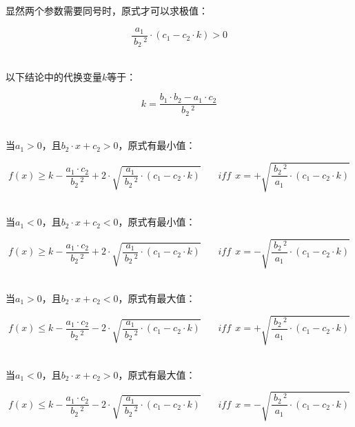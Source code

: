 \documentclass[UTF8]{ctexart}
\begin{document}
\newpage

    显然两个参数需要同号时，原式才可以求极值：
    \begin{large}
        \begin{equation*}
            \frac{a_1}{~b_2\,^2}\cdot(c_1-c_2\cdot k)>0
        \end{equation*}
    \end{large}\\
    以下结论中的代换变量$k$等于：
    \begin{large}
        \begin{equation*}
            k=\frac{b_1\cdot b_2-a_1\cdot c_2}{b_2\,^2}
        \end{equation*}
    \end{large}\\
    当$a_1>0$，且$b_2\cdot x+c_2>0$，原式有最小值：\vspace{3pt}
    \begin{large}
        \begin{equation*}
            f(x)\ge k-\frac{a_1\cdot c_2}{b_2\,^2}+2\cdot\sqrt{\frac{a_1}{~b_2\,^2}\cdot(c_1-c_2\cdot k)}~~~~~~~~iff~~x=+\sqrt{\frac{~b_2\,^2}{a_1}\cdot(c_1-c_2\cdot k)}
        \end{equation*}
    \end{large}\\ \vspace{5pt}
    当$a_1<0$，且$b_2\cdot x+c_2<0$，原式有最小值：\vspace{3pt}
    \begin{large}
        \begin{equation*}
            f(x)\ge k-\frac{a_1\cdot c_2}{b_2\,^2}+2\cdot\sqrt{\frac{a_1}{~b_2\,^2}\cdot(c_1-c_2\cdot k)}~~~~~~~~iff~~x=-\sqrt{\frac{~b_2\,^2}{a_1}\cdot(c_1-c_2\cdot k)}
        \end{equation*}
    \end{large}\\ \vspace{5pt}
    当$a_1>0$，且$b_2\cdot x+c_2<0$，原式有最大值：\vspace{3pt}
    \begin{large}
        \begin{equation*}
            f(x)\le k-\frac{a_1\cdot c_2}{b_2\,^2}-2\cdot\sqrt{\frac{a_1}{~b_2\,^2}\cdot(c_1-c_2\cdot k)}~~~~~~~~iff~~x=+\sqrt{\frac{~b_2\,^2}{a_1}\cdot(c_1-c_2\cdot k)}
        \end{equation*}
    \end{large}\\ \vspace{5pt}
    当$a_1<0$，且$b_2\cdot x+c_2>0$，原式有最大值：\vspace{3pt}
    \begin{large}
        \begin{equation*}
            f(x)\le k-\frac{a_1\cdot c_2}{b_2\,^2}-2\cdot\sqrt{\frac{a_1}{~b_2\,^2}\cdot(c_1-c_2\cdot k)}~~~~~~~~iff~~x=-\sqrt{\frac{~b_2\,^2}{a_1}\cdot(c_1-c_2\cdot k)}
        \end{equation*}
    \end{large}
\end{document}
